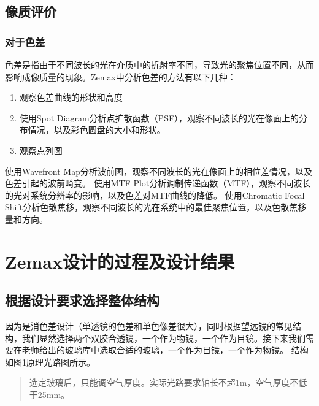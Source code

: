 \documentclass{article}
\begin{document}
\subsection{像质评价}
\subsubsection{对于色差}
色差是指由于不同波长的光在介质中的折射率不同，导致光的聚焦位置不同，从而影响成像质量的现象。Zemax中分析色差的方法有以下几种：
\begin{enumerate}[label=$\varspadesuit$,nosep]%
  \item 观察色差曲线的形状和高度
  \item 使用Spot Diagram分析点扩散函数（PSF），观察不同波长的光在像面上的分布情况，以及彩色圆盘的大小和形状。
  \item 观察点列图
\end{enumerate}

使用Wavefront Map分析波前图，观察不同波长的光在像面上的相位差情况，以及色差引起的波前畸变。
使用MTF Plot分析调制传递函数（MTF），观察不同波长的光对系统分辨率的影响，以及色差对MTF曲线的降低。
使用Chromatic Focal Shift分析色散焦移，观察不同波长的光在系统中的最佳聚焦位置，以及色散焦移量和方向。
\section{Zemax设计的过程及设计结果}
\subsection{根据设计要求选择整体结构}
因为是消色差设计（单透镜的色差和单色像差很大），同时根据望远镜的常见结构，我们显然选择两个双胶合透镜，一个作为物镜，一个作为目镜。接下来我们需要在老师给出的玻璃库中选取合适的玻璃，一个作为目镜，一个作为物镜。
结构如图1原理光路图所示。
\begin{quote}
{\qquad{}\ccwd\kaishu{}
选定玻璃后，只能调空气厚度。实际光路要求轴长不超1m，空气厚度不低于25mm。
}
\end{quote}
\end{document}
